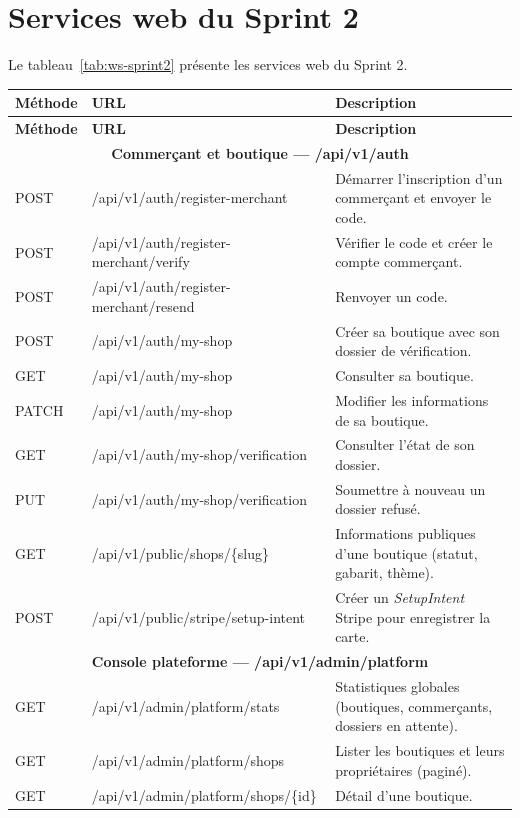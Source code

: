 \section{Services web du Sprint 2}
Le tableau~\ref{tab:ws-sprint2} présente les services web du Sprint 2.
\renewcommand{\arraystretch}{1.15}
\setlength{\tabcolsep}{4pt}
\begin{longtable}{|p{1.8cm}|p{10cm}|p{3.8cm}|}
\hline
\textbf{Méthode} & \textbf{URL} & \textbf{Description} \\
\hline
\endfirsthead
\hline
\textbf{Méthode} & \textbf{URL} & \textbf{Description} \\
\hline
\endhead
\multicolumn{3}{|c|}{\textbf{Commerçant et boutique --- /api/v1/auth}} \\
\hline
POST & /api/v1/auth/register-merchant & Démarrer l'inscription d'un commerçant et envoyer le code. \\
\hline
POST & /api/v1/auth/register-merchant/verify & Vérifier le code et créer le compte commerçant. \\
\hline
POST & /api/v1/auth/register-merchant/resend & Renvoyer un code. \\
\hline
POST & /api/v1/auth/my-shop & Créer sa boutique avec son dossier de vérification. \\
\hline
GET & /api/v1/auth/my-shop & Consulter sa boutique. \\
\hline
PATCH & /api/v1/auth/my-shop & Modifier les informations de sa boutique. \\
\hline
GET & /api/v1/auth/my-shop/verification & Consulter l'état de son dossier. \\
\hline
PUT & /api/v1/auth/my-shop/verification & Soumettre à nouveau un dossier refusé. \\
\hline
GET & /api/v1/public/shops/\{slug\} & Informations publiques d'une boutique (statut, gabarit, thème). \\
\hline
POST & /api/v1/public/stripe/setup-intent & Créer un \textit{SetupIntent} Stripe pour enregistrer la carte. \\
\hline
\multicolumn{3}{|c|}{\textbf{Console plateforme --- /api/v1/admin/platform}} \\
\hline
GET & /api/v1/admin/platform/stats & Statistiques globales (boutiques, commerçants, dossiers en attente). \\
\hline
GET & /api/v1/admin/platform/shops & Lister les boutiques et leurs propriétaires (paginé). \\
\hline
GET & /api/v1/admin/platform/shops/\{id\} & Détail d'une boutique. \\

\end{longtable}
